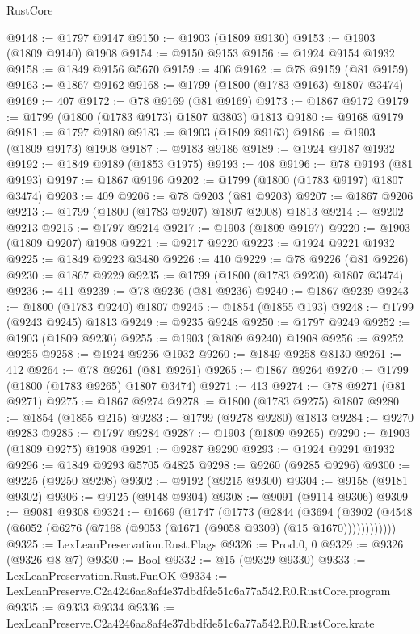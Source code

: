 \begin{lexlean}{RustCore}
\begin{coremodule}
@9148 := @1797 @9147
@9150 := @1903 (@1809 @9130)
@9153 := @1903 (@1809 @9140) @1908
@9154 := @9150 @9153
@9156 := @1924 @9154 @1932
@9158 := @1849 @9156 @5670
@9159 := 406
@9162 := @78 @9159 (@81 @9159)
@9163 := @1867 @9162
@9168 := @1799 (@1800 (@1783 @9163) @1807 @3474)
@9169 := 407
@9172 := @78 @9169 (@81 @9169)
@9173 := @1867 @9172
@9179 := @1799 (@1800 (@1783 @9173) @1807 @3803) @1813
@9180 := @9168 @9179
@9181 := @1797 @9180
@9183 := @1903 (@1809 @9163)
@9186 := @1903 (@1809 @9173) @1908
@9187 := @9183 @9186
@9189 := @1924 @9187 @1932
@9192 := @1849 @9189 (@1853 @1975)
@9193 := 408
@9196 := @78 @9193 (@81 @9193)
@9197 := @1867 @9196
@9202 := @1799 (@1800 (@1783 @9197) @1807 @3474)
@9203 := 409
@9206 := @78 @9203 (@81 @9203)
@9207 := @1867 @9206
@9213 := @1799 (@1800 (@1783 @9207) @1807 @2008) @1813
@9214 := @9202 @9213
@9215 := @1797 @9214
@9217 := @1903 (@1809 @9197)
@9220 := @1903 (@1809 @9207) @1908
@9221 := @9217 @9220
@9223 := @1924 @9221 @1932
@9225 := @1849 @9223 @3480
@9226 := 410
@9229 := @78 @9226 (@81 @9226)
@9230 := @1867 @9229
@9235 := @1799 (@1800 (@1783 @9230) @1807 @3474)
@9236 := 411
@9239 := @78 @9236 (@81 @9236)
@9240 := @1867 @9239
@9243 := @1800 (@1783 @9240) @1807
@9245 := @1854 (@1855 @193)
@9248 := @1799 (@9243 @9245) @1813
@9249 := @9235 @9248
@9250 := @1797 @9249
@9252 := @1903 (@1809 @9230)
@9255 := @1903 (@1809 @9240) @1908
@9256 := @9252 @9255
@9258 := @1924 @9256 @1932
@9260 := @1849 @9258 @8130
@9261 := 412
@9264 := @78 @9261 (@81 @9261)
@9265 := @1867 @9264
@9270 := @1799 (@1800 (@1783 @9265) @1807 @3474)
@9271 := 413
@9274 := @78 @9271 (@81 @9271)
@9275 := @1867 @9274
@9278 := @1800 (@1783 @9275) @1807
@9280 := @1854 (@1855 @215)
@9283 := @1799 (@9278 @9280) @1813
@9284 := @9270 @9283
@9285 := @1797 @9284
@9287 := @1903 (@1809 @9265)
@9290 := @1903 (@1809 @9275) @1908
@9291 := @9287 @9290
@9293 := @1924 @9291 @1932
@9296 := @1849 @9293 @5705 @4825
@9298 := @9260 (@9285 @9296)
@9300 := @9225 (@9250 @9298)
@9302 := @9192 (@9215 @9300)
@9304 := @9158 (@9181 @9302)
@9306 := @9125 (@9148 @9304)
@9308 := @9091 (@9114 @9306)
@9309 := @9081 @9308
@9324 := @1669
    (@1747
      (@1773
        (@2844
          (@3694
            (@3902 (@4548 (@6052 (@6276 (@7168 (@9053 (@1671 (@9058 @9309) (@15 @1670))))))))))))
@9325 := LexLeanPreservation.Rust.Flags
@9326 := Prod.{0, 0}
@9329 := @9326 (@9326 @8 @7)
@9330 := Bool
@9332 := @15 (@9329 @9330)
@9333 := LexLeanPreservation.Rust.FunOK
@9334 := LexLeanPreserve.C2a4246aa8af4e37dbdfde51c6a77a542.R0.RustCore.program
@9335 := @9333 @9334
@9336 := LexLeanPreserve.C2a4246aa8af4e37dbdfde51c6a77a542.R0.RustCore.krate

\end{coremodule}
\end{lexlean}
